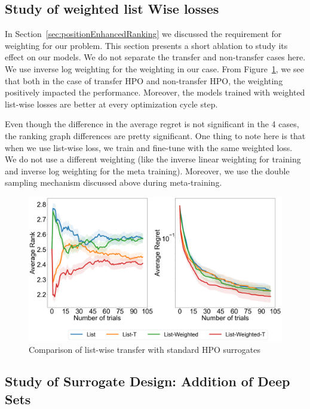 \documentclass[12pt, twoside, ngerman]{report}
\begin{document}
\subsection{Study of weighted list Wise losses}

In Section~\ref{sec:positionEnhancedRanking} we discussed the requirement for weighting for our problem.
This section presents a short ablation to study its effect on our models.
We do not separate the transfer and non-transfer cases here.
We use inverse log weighting for the weighting in our case.
From Figure~\ref{fig:Q2Ablation}, we see that both in the case of transfer HPO and non-transfer HPO, the weighting positively impacted the performance. Moreover, the models trained with weighted list-wise losses are better at every optimization cycle step.

Even though the difference in the average regret is not significant in the 4 cases,  the ranking graph differences are pretty significant. One thing to note here is that when we use list-wise loss,  we train and fine-tune with the same weighted loss. We do not use a different weighting (like the inverse linear weighting for training and inverse log weighting for the meta training). Moreover, we use the double sampling mechanism discussed above during meta-training.

\begin{figure}[h]
  \centering
    \includegraphics[scale=0.25]{images/Q2Ablation}
    \caption{Comparison of list-wise transfer with standard HPO surrogates}
    \label{fig:Q2Ablation}
\end{figure}


\subsection{Study of Surrogate Design: Addition of Deep Sets}
\end{document}
